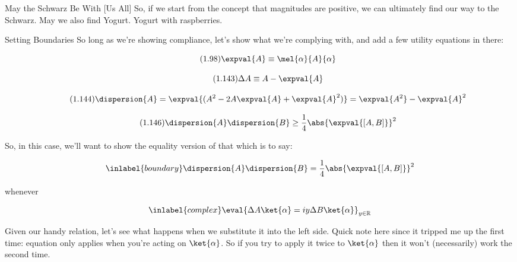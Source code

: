 \begin{answer}
\begin{answerpart}{May the Schwarz Be With [Us All]}
    So, if we start from the concept that magnitudes are positive, we
    can ultimately find our way to the Schwarz.  May we also find
    Yogurt.  Yogurt with raspberries.
  \end{answerpart}

  \begin{answerpart}{Setting Boundaries}
    So long as we're showing compliance, let's show what we're
    complying with, and add a few utility equations in there:

    \begin{equation}
      \tag{1.98}
      \expval{A} \equiv \mel{\alpha}{A}{\alpha}
    \end{equation}

    \begin{equation}
      \tag{1.143}
      \Delta A \equiv A - \expval{A}
    \end{equation}
    
    \begin{equation}
      \tag{1.144}
      \dispersion{A}
      = \expval{(A^2 - 2A\expval{A} + \expval{A}^2)}
      = \expval{A^2} - \expval{A}^2
    \end{equation}

    \begin{equation}
      \tag{1.146}
      \dispersion{A}\dispersion{B} \ge \frac{1}{4} \abs{\expval{[A, B]}}^2
    \end{equation}

    So, in this case, we'll want to show the equality version of that
    which is to say:

    \begin{equation}
      \inlabel{boundary}
      \dispersion{A}\dispersion{B} = \frac{1}{4} \abs{\expval{[A, B]}}^2
    \end{equation}

    whenever

    \begin{equation}
      \inlabel{complex}
      \eval{\Delta A \ket{\alpha} = iy \Delta B \ket{\alpha}}_{y \in \mathbb{R}}
    \end{equation}

    Given our handy relation, let's see what happens when we
    substitute it into the left side.  Quick note here since it
    tripped me up the first time: equation  only
    applies when you're acting on $\ket{\alpha}$.  So if you try to
    apply it twice to $\ket{\alpha}$ then it won't (necessarily) work
    the second time.


\end{answerpart}
\end{answer}
